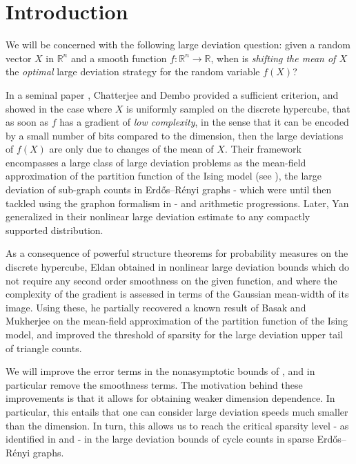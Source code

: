 \documentclass[aop,preprint]{imsart}
\newcommand\RR{\mathbb{R}}
\numberwithin{equation}{section}
\theoremstyle{definition}
\theoremstyle{plain}
\theoremstyle{remark}
\begin{document}
\section{Introduction}
We will be concerned with the following large deviation question: given a random vector $X$ in $\RR^n$ and a smooth function $f : \RR^n \to \RR$, when is \textit{shifting the mean of $X$} the \textit{optimal} large deviation strategy for the random variable $f(X)$?  

In a seminal paper \cite{CD}, Chatterjee and Dembo provided a sufficient criterion, and showed in the case where $X$ is uniformly sampled on the discrete hypercube, that as soon as $f$ has a gradient of \textit{low complexity}, in the sense that it can be encoded by a small number of bits compared to the dimension, then the large deviations of $f(X)$ are only due to changes of the mean of $X$. Their framework encompasses a large class of large deviation problems as the mean-field approximation of the partition function of the Ising model (see \cite{BM}), the large deviation of sub-graph counts in  Erd\H{o}s--R\'enyi graphs - which were until then tackled using the graphon formalism in \cite{CV} - and arithmetic progressions. Later, Yan generalized in \cite{Yan} their nonlinear large deviation estimate to any compactly supported distribution. 

As a consequence of powerful structure theorems for probability measures on the discrete hypercube, Eldan obtained in \cite{Eldan} nonlinear large deviation bounds which do not require any second order smoothness on the given function, and where the complexity of the gradient is assessed in terms of the Gaussian mean-width of its image. Using these, he partially recovered a known result of Basak and Mukherjee \cite{BM} on the mean-field approximation of the partition function of the Ising model, and improved the threshold of sparsity for the large deviation upper tail  of triangle counts.   


We will improve the error terms in the nonasymptotic bounds of \cite{CD}, and in particular remove the smoothness terms.  The motivation behind these improvements is that it allows for obtaining weaker dimension dependence. In particular, this entails that one can consider large deviation speeds much smaller than the dimension. In turn, this allows us to reach the critical sparsity level - as identified in \cite{LZ} and \cite{BGLZ} - in the large deviation bounds of cycle counts in sparse  Erd\H{o}s--R\'enyi graphs.  
\end{document}
